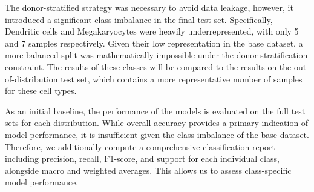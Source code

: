 \documentclass[11pt]{article}
\begin{document}
The donor-stratified strategy was necessary to avoid data leakage, however, it introduced a significant class imbalance in the final test set. Specifically, Dendritic cells and Megakaryocytes were heavily underrepresented, with only 5 and 7 samples respectively. Given their low representation in the base dataset, a more balanced split was mathematically impossible under the donor-stratification constraint. The results of these classes will be compared to the results on the out-of-distribution test set, which contains a more representative number of samples for these cell types.

As an initial baseline, the performance of the models is evaluated on the full test sets for each distribution. While overall accuracy provides a primary indication of model performance, it is insufficient given the class imbalance of the base dataset. Therefore, we additionally compute a comprehensive classification report including precision, recall, F1-score, and support for each individual class, alongside macro and weighted averages. This allows us to assess class-specific model performance.



\end{document}

